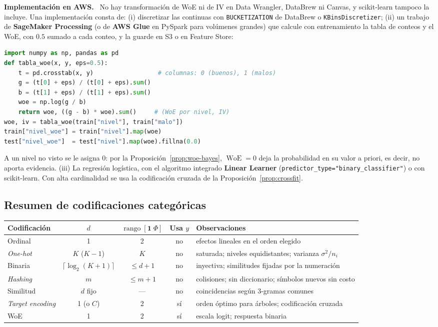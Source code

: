 \documentclass[11pt,a4paper]{article}
\theoremstyle{plain}
\theoremstyle{definition}
\theoremstyle{remark}
\newcommand{\WoE}{\operatorname{WoE}}
\newcommand{\rango}{\operatorname{rango}}
\newcommand{\1}{\mathbf{1}}
\newenvironment{aws}{\par\medskip\sloppy\noindent\textbf{Implementación en AWS.}\ }{\par\medskip}
\begin{document}
\begin{aws}
No hay transformación de WoE ni de IV en Data Wrangler, DataBrew ni
Canvas, y scikit-learn tampoco la incluye. Una implementación consta de:
(i) discretizar las continuas con \texttt{BUCKETIZATION} de DataBrew o
\texttt{KBinsDiscretizer}; (ii) un trabajo de \textbf{SageMaker
Processing} (o de \textbf{AWS Glue} en PySpark para volúmenes grandes) que
calcule con entrenamiento la tabla de conteos y el WoE, con $0.5$ sumado a
cada conteo, y la guarde en S3 o en Feature Store:
\begin{lstlisting}[language=Python]
import numpy as np, pandas as pd
def tabla_woe(x, y, eps=0.5):
    t = pd.crosstab(x, y)                  # columnas: 0 (buenos), 1 (malos)
    g = (t[0] + eps) / (t[0] + eps).sum()
    b = (t[1] + eps) / (t[1] + eps).sum()
    woe = np.log(g / b)
    return woe, ((g - b) * woe).sum()     # (WoE por nivel, IV)
woe, iv = tabla_woe(train["nivel"], train["malo"])
train["nivel_woe"] = train["nivel"].map(woe)
test["nivel_woe"]  = test["nivel"].map(woe).fillna(0.0)
\end{lstlisting}
A un nivel no visto se le asigna $0$: por la
Proposición~\ref{prop:woe-bayes}, $\WoE=0$ deja la probabilidad en su
valor a priori, es decir, no aporta evidencia. (iii) La regresión
logística, con el algoritmo integrado \textbf{Linear Learner}
(\texttt{predictor\_type="binary\_classifier"}) o con scikit-learn. Con
alta cardinalidad se usa la codificación cruzada de la
Proposición~\ref{prop:crossfit}.
\end{aws}

\subsection{Resumen de codificaciones categóricas}

\begin{center}
\small
\begin{tabularx}{\textwidth}{@{}lcccY@{}}
\toprule
Codificación & $d$ & $\rango[\1\;\Phi]$ & Usa $y$ & Observaciones\\
\midrule
Ordinal & 1 & 2 & no & efectos lineales en el orden elegido\\
\emph{One-hot} & $K$ ($K-1$) & $K$ & no & saturada; niveles equidistantes; varianza $\sigma^2/n_i$\\
Binaria & $\lceil\log_2(K+1)\rceil$ & $\le d+1$ & no & inyectiva; similitudes fijadas por la numeración\\
\emph{Hashing} & $m$ & $\le m+1$ & no & colisiones; sin diccionario; símbolos nuevos sin costo\\
Similitud & $d$ fijo & --- & no & coincidencias según 3-gramas comunes\\
\emph{Target encoding} & 1 (o $C$) & 2 & sí & orden óptimo para árboles; codificación cruzada\\
WoE & 1 & 2 & sí & escala logit; respuesta binaria\\
\bottomrule
\end{tabularx}
\end{center}
\end{document}
